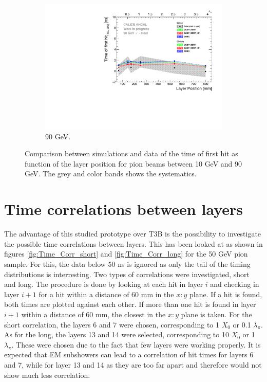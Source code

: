 \begin{figure}[htbp!]
\begin{subfigure}[t]{0.5\textwidth}
		\includegraphics[width=1\textwidth]{chap5/fig_AHCAL_timing/Pions/ComparisonToSim/Time_Depth_90GeV.pdf}
		\caption{90 GeV.} \label{fig:Depth_SimData_90GeV}
	\end{subfigure}
	\caption{Comparison between simulations and data of the time of first hit as function of the layer position for pion beams between 10 GeV and 90 GeV. The grey and color bands shows the systematics.}
	\label{fig:Depth_SimData_Comparison}
\end{figure}

\section{Time correlations between layers}

The advantage of this studied prototype over T3B is the possibility to investigate the possible time correlations between layers. This has been looked at as shown in figures \ref{fig:Time_Corr_short} and \ref{fig:Time_Corr_long} for the 50 GeV pion sample. For this, the data below 50 ns is ignored as only the tail of the timing distributions is interresting. Two types of correlations were investigated, short and long. The procedure is done by looking at each hit in layer $i$ and checking in layer $i+1$ for a hit within a distance of 60 mm in the $x:y$ plane. If a hit is found, both times are plotted against each other. If more than one hit is found in layer $i+1$ within a distance of 60 mm, the closest in the $x:y$ plane is taken. For the short correlation, the layers 6 and 7 were chosen, corresponding to 1 $X_0$ or 0.1 $\lambda_{\pi}$. As for the long, the layers 13 and 14 were selected, corresponding to 10 $X_0$ or 1 $\lambda_{\pi}$. These were chosen due to the fact that few layers were working properly. It is expected that EM subshowers can lead to a correlation of hit times for layers 6 and 7, while for layer 13 and 14 as they are too far apart and therefore would not show much less correlation.

